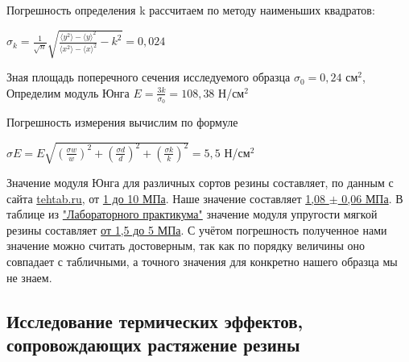 \documentclass[a4paper]{article}
\begin{document}
\begin{enumerate}
Погрешность определения k рассчитаем по методу наименьших квадратов:
\begin{center} 
$\sigma_k = \frac{1}{\sqrt{n}}\sqrt{\frac{\langle y^2 \rangle - \langle y \rangle ^2}{\langle x^2 \rangle - \langle x \rangle ^2} - k^2} = 0,024$
\end{center}

Зная площадь поперечного сечения исследуемого образца $\sigma_0 = 0,24$ см$^2$, Определим модуль Юнга $E = \frac{3k}{\sigma_0} = 108,38$ Н/см$^2$

Погрешность измерения вычислим по формуле
\begin{center}
$\sigma E = E\sqrt{(\frac{\sigma w}{w})^2 + (\frac{\sigma d}{d})^2 + (\frac{\sigma k}{k})^2} = 5,5$ Н/см$^2$
\end{center}

Значение модуля Юнга для различных сортов резины составляет, по данным с сайта \underline{tehtab.ru}, от \underline{1 до 10 МПа}. Наше значение составляет \underline{1,08 $\pm$ 0,06 МПа}. 
В таблице из \underline{"Лабораторного практикума"} значение модуля упругости мягкой резины составляет \underline{от 1,5 до 5 МПа}. С учётом погрешность полученное нами значение можно считать достоверным, так как по порядку величины оно совпадает с табличными, а точного значения для конкретно нашего образца мы не знаем.

\end{enumerate}

\subsection{Исследование термических эффектов, сопровождающих растяжение резины}
\end{document}
